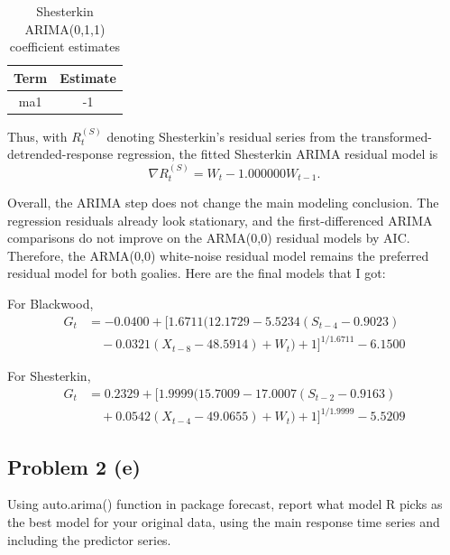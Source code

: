 \documentclass[
  10pt,
]{extarticle}
\begin{document}
\begin{center}
\scriptsize
\begin{table}[H]

\caption{\label{tab:p2-arima-shesterkin-coef}Shesterkin ARIMA(0,1,1) coefficient estimates}
\centering
\begin{tabular}[t]{cc}
\toprule
Term & Estimate\\
\midrule
ma1 & -1\\
\bottomrule
\end{tabular}
\end{table}
\normalsize
\end{center}

Thus, with \(R_t^{(S)}\) denoting Shesterkin's residual series from the transformed-detrended-response regression, the fitted Shesterkin ARIMA residual model is
\[
\nabla R_t^{(S)} = W_t - 1.000000 W_{t-1}.
\]

Overall, the ARIMA step does not change the main modeling conclusion. The regression residuals already look stationary, and the first-differenced ARIMA comparisons do not improve on the ARMA(0,0) residual models by AIC. Therefore, the ARMA(0,0) white-noise residual model remains the preferred residual model for both goalies. Here are the final models that I got:

For Blackwood,
\[\begin{aligned}
G_t &= -0.0400 + \Big[ 1.6711 \big(12.1729 - 5.5234 (S_{t-4} - 0.9023) \\ 
&\quad - 0.0321 (X_{t-8} - 48.5914) + W_t \big) + 1 \Big]^{1/1.6711} - 6.1500
\end{aligned}\]

For Shesterkin,
\[\begin{aligned}
G_t &= 0.2329 + \Big[ 1.9999 \big(15.7009 - 17.0007 (S_{t-2} - 0.9163) \\ 
&\quad + 0.0542 (X_{t-4} - 49.0655) + W_t \big) + 1 \Big]^{1/1.9999} - 5.5209
\end{aligned}\]

\newpage

\subsection{Problem 2 (e)}\label{problem-2-e}

\begin{problem}[Problem 2 (e)]
Using auto.arima() function in package forecast, report what model R picks as the best model for your original data, using the main response time series and including the predictor series.
\end{problem}
\end{document}
